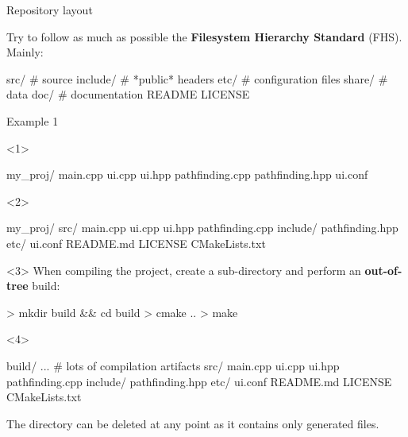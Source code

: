 \documentclass[compress]{beamer}
\begin{document}
\begin{frame}[fragile]{Repository layout}

Try to follow as much as possible the {\bf Filesystem Hierarchy
 Standard} (FHS). Mainly:

\begin{shcode}
src/        # source
include/    # *public* headers
etc/        # configuration files
share/      # data
doc/        # documentation
README
LICENSE
\end{shcode}

\centering


\end{frame}

\begin{frame}[fragile]{Example 1}

\begin{onlyenv}<1>
\begin{shcode}
my_proj/
  main.cpp
  ui.cpp
  ui.hpp
  pathfinding.cpp
  pathfinding.hpp
  ui.conf
\end{shcode}

\end{onlyenv}

\begin{onlyenv}<2>
\begin{shcode}
my_proj/
  src/
    main.cpp
    ui.cpp
    ui.hpp
    pathfinding.cpp
  include/
    pathfinding.hpp
  etc/
    ui.conf
  README.md
  LICENSE
  CMakeLists.txt
\end{shcode}

\end{onlyenv}

\begin{onlyenv}<3>
When compiling the project, create a sub-directory  and perform an
    \textbf{out-of-tree} build:

\begin{shcode}
> mkdir build && cd build
> cmake ..
> make
\end{shcode}

\end{onlyenv}

\begin{onlyenv}<4>

\begin{shcode}
build/
  ... # lots of compilation artifacts
src/
  main.cpp
  ui.cpp
  ui.hpp
  pathfinding.cpp
include/
  pathfinding.hpp
etc/
  ui.conf
README.md
LICENSE
CMakeLists.txt
\end{shcode}

    The  directory can be deleted at any point as it contains only
    generated files.
\end{onlyenv}
\end{frame}
\end{document}
